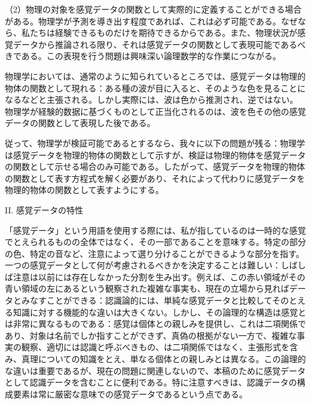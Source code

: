 \documentclass[a4paper,11pt,openany]{ltjsbook}
\begin{document}
（2）物理の対象を感覚データの関数として実際的に定義することができる場合がある。物理学が予測を導き出す程度であれば、これは必ず可能である。なぜなら、私たちは経験できるものだけを期待できるからである。また、物理状況が感覚データから推論される限り、それは感覚データの関数として表現可能であるべきである。この表現を行う問題は興味深い論理数学的な作業につながる。

物理学においては、通常のように知られているところでは、感覚データは物理的物体の関数として現れる：ある種の波が目に入ると、そのような色を見ることになるなどと主張される。しかし実際には、波は色から推測され、逆ではない。物理学が経験的数据に基づくものとして正当化されるのは、波を色その他の感覚データの関数として表現した後である。

従って、物理学が検証可能であるとするなら、我々に以下の問題が残る：物理学は感覚データを物理的物体の関数として示すが、検証は物理的物体を感覚データの関数として示せる場合のみ可能である。したがって、感覚データを物理的物体の関数として表す方程式を解く必要があり、それによって代わりに感覚データを物理的物体の関数として表すようにする。

II. 感覚データの特性

「感覚データ」という用語を使用する際には、私が指しているのは一時的な感覚でとえられるものの全体ではなく、その一部であることを意味する。特定の部分の色、特定の音など、注意によって選り分けることができるような部分を指す。一つの感覚データとして何が考慮されるべきかを決定することは難しい：しばしば注意は以前には存在しなかった分割を生み出す。例えば、この赤い領域がその青い領域の左にあるという観察された複雑な事実も、現在の立場から見ればデータとみなすことができる：認識論的には、単純な感覚データと比較してそのとえる知識に対する機能的な違いは大きくない。しかし、その論理的な構造は感覚とは非常に異なるものである：感覚は個体との親しみを提供し、これは二項関係であり、対象は名前でしか指すことができず、真偽の根拠がない一方で、複雑な事実の観察、適切には認識と呼ぶべきもの、は二項関係ではなく、主張形式を含み、真理についての知識をとえ、単なる個体との親しみとは異なる。この論理的な違いは重要であるが、現在の問題に関連しないので、本稿のために感覚データとして認識データを含むことに便利である。特に注意すべきは、認識データの構成要素は常に厳密な意味での感覚データであるという点である。
\end{document}
